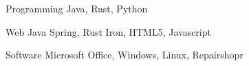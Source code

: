 


\begin{cvskills}


\cvskill
{Programming} %
{Java, Rust, Python} %


\cvskill
{Web} %
{Java Spring, Rust Iron, HTML5, Javascript} %


\cvskill
{Software} %
{Microsoft Office, Windows, Linux, Repairshopr} %


\end{cvskills}
